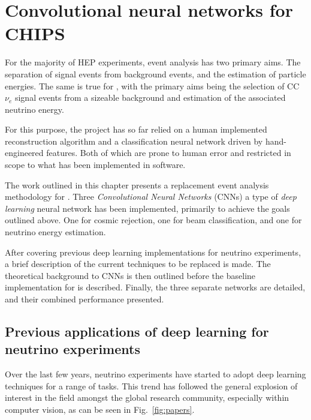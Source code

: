 \chapter{Convolutional neural networks for CHIPS} %
\label{chap:cvn} %

For the majority of HEP experiments, event analysis has two primary aims. The separation of signal
events from background events, and the estimation of particle energies. The same is true for
\chips, with the primary aims being the selection of CC $\nu_{e}$ signal events from a sizeable
background and estimation of the associated neutrino energy.

For this purpose, the \chips project has so far relied on a human implemented reconstruction
algorithm and a classification neural network driven by hand-engineered features. Both of which
are prone to human error and restricted in scope to what has been implemented in software.

The work outlined in this chapter presents a replacement event analysis methodology for \chips.
Three \emph{Convolutional Neural Networks} (CNNs) a type of \emph{deep learning} neural network
has been implemented, primarily to achieve the goals outlined above. One for cosmic rejection, one
for beam classification, and one for neutrino energy estimation.

After covering previous deep learning implementations for neutrino experiments, a brief
description of the current techniques to be replaced is made. The theoretical background to CNNs
is then outlined before the baseline implementation for \chips is described. Finally, the three
separate networks are detailed, and their combined performance presented.

\section{Previous applications of deep learning for neutrino experiments} %
\label{sec:cvn_previous} %

Over the last few years, neutrino experiments have started to adopt deep learning techniques for a
range of tasks. This trend has followed the general explosion of interest in the field amongst the
global research community, especially within computer vision, as can be seen in
Fig.~\ref{fig:papers}.

